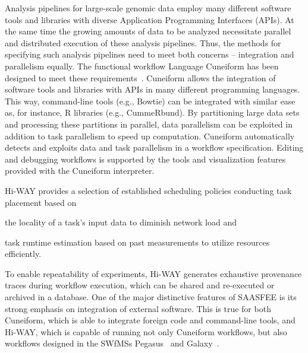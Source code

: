 Analysis pipelines for large-scale genomic data employ many different software tools and libraries with diverse Application Programming Interfaces (APIs). At the same time the growing amounts of data to be analyzed necessitate parallel and distributed execution of these analysis pipelines. Thus, the methods for specifying such analysis pipelines need to meet both concerns -- integration and parallelism equally. The functional workflow Language Cuneiform has been designed to meet these requirements~\cite{Brandt2015}. Cuneiform allows the integration of software tools and libraries with APIs in many different programming languages. This way, command-line tools (e.g., Bowtie) can be integrated with similar ease as, for instance, R libraries (e.g., CummeRbund). By partitioning large data sets and processing these partitions in parallel, data parallelism can be exploited in addition to task parallelism to speed up computation. Cuneiform automatically detects and exploits data and task parallelism in a workflow specification. Editing and debugging workflows is supported by the tools and visualization features provided with the Cuneiform interpreter.

Hi-WAY provides a selection of established scheduling policies conducting task placement based on
\begin{inparaenum}[(a)]
  \item the locality of a task's input data to diminish network load and
  \item task runtime estimation based on past measurements to utilize resources efficiently.
\end{inparaenum}
To enable repeatability of experiments, Hi-WAY generates exhaustive provenance traces during workflow execution, which can be shared and re-executed or archived in a database. One of the major distinctive features of SAASFEE is its strong emphasis on integration of external software. This is true for both Cuneiform, which is able to integrate foreign code and command-line tools, and Hi-WAY, which is capable of running not only Cuneiform workflows, but also workflows designed in the SWfMSs Pegasus~\cite{pegasus_fgcs} and Galaxy~\cite{Goecks10}.



